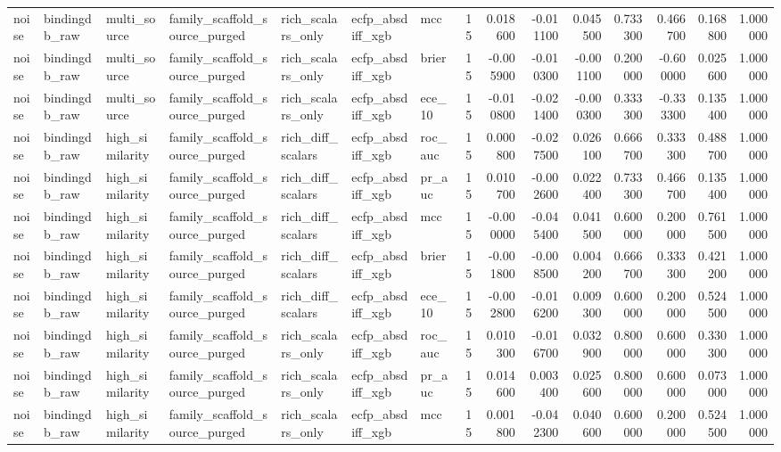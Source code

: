 \begin{longtable}{lllllllrrrrrrrr}
noise & bindingdb\_raw & multi\_source & family\_scaffold\_source\_purged & rich\_scalars\_only & ecfp\_absdiff\_xgb & mcc & 15 & 0.018600 & -0.011100 & 0.045500 & 0.733300 & 0.466700 & 0.168800 & 1.000000 \\
noise & bindingdb\_raw & multi\_source & family\_scaffold\_source\_purged & rich\_scalars\_only & ecfp\_absdiff\_xgb & brier & 15 & -0.005900 & -0.010300 & -0.001100 & 0.200000 & -0.600000 & 0.025600 & 1.000000 \\
noise & bindingdb\_raw & multi\_source & family\_scaffold\_source\_purged & rich\_scalars\_only & ecfp\_absdiff\_xgb & ece\_10 & 15 & -0.010800 & -0.021400 & -0.000300 & 0.333300 & -0.333300 & 0.135400 & 1.000000 \\
noise & bindingdb\_raw & high\_similarity & family\_scaffold\_source\_purged & rich\_diff\_scalars & ecfp\_absdiff\_xgb & roc\_auc & 15 & 0.000800 & -0.027500 & 0.026100 & 0.666700 & 0.333300 & 0.488700 & 1.000000 \\
noise & bindingdb\_raw & high\_similarity & family\_scaffold\_source\_purged & rich\_diff\_scalars & ecfp\_absdiff\_xgb & pr\_auc & 15 & 0.010700 & -0.002600 & 0.022400 & 0.733300 & 0.466700 & 0.135400 & 1.000000 \\
noise & bindingdb\_raw & high\_similarity & family\_scaffold\_source\_purged & rich\_diff\_scalars & ecfp\_absdiff\_xgb & mcc & 15 & -0.000000 & -0.045400 & 0.041500 & 0.600000 & 0.200000 & 0.761500 & 1.000000 \\
noise & bindingdb\_raw & high\_similarity & family\_scaffold\_source\_purged & rich\_diff\_scalars & ecfp\_absdiff\_xgb & brier & 15 & -0.001800 & -0.008500 & 0.004200 & 0.666700 & 0.333300 & 0.421200 & 1.000000 \\
noise & bindingdb\_raw & high\_similarity & family\_scaffold\_source\_purged & rich\_diff\_scalars & ecfp\_absdiff\_xgb & ece\_10 & 15 & -0.002800 & -0.016200 & 0.009300 & 0.600000 & 0.200000 & 0.524500 & 1.000000 \\
noise & bindingdb\_raw & high\_similarity & family\_scaffold\_source\_purged & rich\_scalars\_only & ecfp\_absdiff\_xgb & roc\_auc & 15 & 0.010300 & -0.016700 & 0.032900 & 0.800000 & 0.600000 & 0.330300 & 1.000000 \\
noise & bindingdb\_raw & high\_similarity & family\_scaffold\_source\_purged & rich\_scalars\_only & ecfp\_absdiff\_xgb & pr\_auc & 15 & 0.014600 & 0.003400 & 0.025600 & 0.800000 & 0.600000 & 0.073000 & 1.000000 \\
noise & bindingdb\_raw & high\_similarity & family\_scaffold\_source\_purged & rich\_scalars\_only & ecfp\_absdiff\_xgb & mcc & 15 & 0.001800 & -0.042300 & 0.040600 & 0.600000 & 0.200000 & 0.524500 & 1.000000 \\

\end{longtable}
